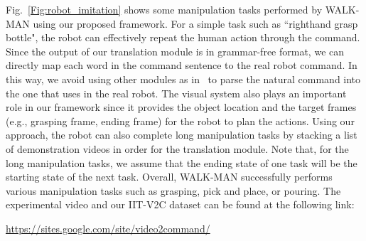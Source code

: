 Fig.~\ref{Fig:robot_imitation} shows some manipulation tasks performed by WALK-MAN using our proposed framework. For a simple task such as ``righthand grasp bottle", the robot can effectively repeat the human action through the command. Since the output of our translation module is in grammar-free format, we can directly map each word in the command sentence to the real robot command. In this way, we avoid using other modules as in~\cite{Tellex2011} to parse the natural command into the one that uses in the real robot. The visual system also plays an important role in our framework since it provides the object location and the target frames (e.g., grasping frame, ending frame) for the robot to plan the actions. Using our approach, the robot can also complete long manipulation tasks by stacking a list of demonstration videos in order for the translation module. Note that, for the long manipulation tasks, we assume that the ending state of one task will be the starting state of the next task. Overall, WALK-MAN successfully performs various manipulation tasks such as grasping, pick and place, or pouring. The experimental video and our IIT-V2C dataset can be found at the following link:
\vspace{1ex}
\centerline{\url{https://sites.google.com/site/video2command/}}






